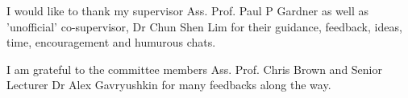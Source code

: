 \begin{acknowledgements}
I would like to thank my supervisor Ass. Prof. Paul P Gardner as well as 'unofficial' co-supervisor, Dr Chun Shen Lim for their guidance, feedback, ideas, time, encouragement and humurous chats. 

I am grateful to the committee members Ass. Prof. Chris Brown and Senior Lecturer Dr Alex Gavryushkin for many feedbacks along the way. 


\end{acknowledgements}